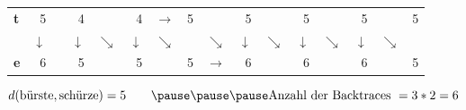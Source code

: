 \documentclass{beamer}
\begin{document}
\begin{frame}
\begin{tabular}{l|rrrrrrrlrrrlrlr}
		\textbf{t}     & 5     &       & 4     &       & 4     & $\rightarrow$ & 5     &       & 5     &       & 5     &       & 5     &       & 5 \\
		& $\downarrow$ &       & $\downarrow$ & $\searrow$ & $\downarrow$ & $\searrow$ &       & $\searrow$ & $\downarrow$ & $\searrow$ & $\downarrow$ & $\searrow$ & $\downarrow$ & \alert<3->{$\searrow$} &  \\
		\textbf{e}     & 6     &       & 5     &       & 5     &       & 5     & $\rightarrow$ & 6     &       & 6     & & 6     &  & 5 \\
	\end{tabular}%

	\pause

	\begin{equation*}
		d(\text{bürste}, \text{schürze}) = 5 \qquad \pause \pause \pause \text{Anzahl der Backtraces } = 3 * 2 = 6
	\end{equation*}
\end{frame}
\end{document}
